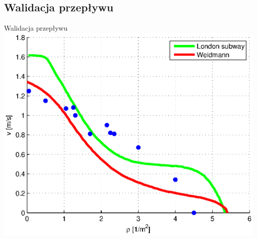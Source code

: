 \subsection{Walidacja przepływu}
\begin{frame}{Walidacja przepływu}
\includegraphics[width=\textwidth,height=0.8\textheight,keepaspectratio]{wykresy-weidmann_valid}
\end{frame}

